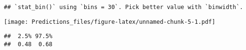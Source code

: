 \documentclass[
]{article}
\newenvironment{Shaded}{\begin{snugshade}}{\end{snugshade}}
\newcommand{\FloatTok}[1]{\textcolor[rgb]{0.00,0.00,0.81}{#1}}
\newcommand{\FunctionTok}[1]{\textcolor[rgb]{0.00,0.00,0.00}{#1}}
\newcommand{\NormalTok}[1]{#1}
\newcommand{\OtherTok}[1]{\textcolor[rgb]{0.56,0.35,0.01}{#1}}
\newcommand{\SpecialCharTok}[1]{\textcolor[rgb]{0.00,0.00,0.00}{#1}}
\begin{document}
\begin{verbatim}
## `stat_bin()` using `bins = 30`. Pick better value with `binwidth`.
\end{verbatim}

\texttt{[image: Predictions\_files/figure-latex/unnamed-chunk-5-1.pdf]}

\begin{Shaded}
\end{Shaded}

\begin{verbatim}
##  2.5% 97.5% 
##  0.48  0.68
\end{verbatim}
\end{document}
